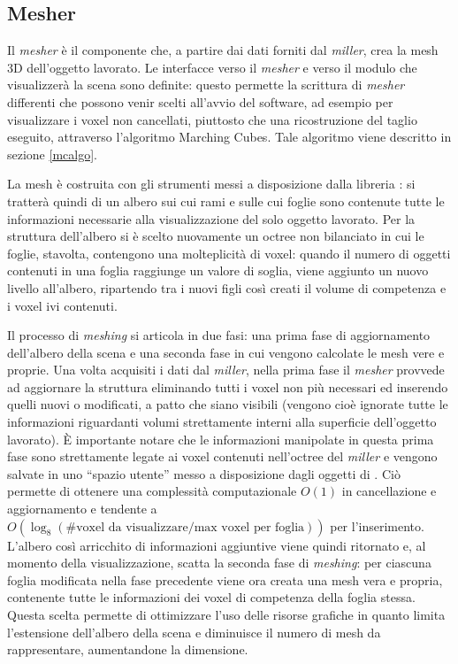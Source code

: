 \subsection{Mesher}
\label{sec:modules_mesher}
Il \emph{mesher} è il componente che, a partire dai dati forniti dal \emph{miller}, crea la mesh 3D dell'oggetto lavorato. Le interfacce verso il \emph{mesher} e verso il modulo che visualizzerà la scena sono definite: questo permette la scrittura di \emph{mesher} differenti che possono venir scelti all'avvio del software, ad esempio per visualizzare i voxel non cancellati, piuttosto che una ricostruzione del taglio eseguito, attraverso l'algoritmo Marching Cubes. Tale algoritmo viene descritto in sezione \ref{mcalgo}.

La mesh è costruita con gli strumenti messi a disposizione dalla libreria \osg: si tratterà quindi di un albero sui cui rami e sulle cui foglie sono contenute tutte le informazioni necessarie alla visualizzazione del solo oggetto lavorato. Per la struttura dell'albero si è scelto nuovamente un octree non bilanciato in cui le foglie, stavolta, contengono una molteplicità di voxel: quando il numero di oggetti contenuti in una foglia raggiunge un valore di soglia, viene aggiunto un nuovo livello all'albero, ripartendo tra i nuovi figli così creati il volume di competenza e i voxel ivi contenuti.

Il processo di \emph{meshing} si articola in due fasi: una prima fase di aggiornamento dell'albero della scena e una seconda fase in cui vengono calcolate le mesh vere e proprie. Una volta acquisiti i dati dal \emph{miller}, nella prima fase il \emph{mesher} provvede ad aggiornare la struttura eliminando tutti i voxel non più necessari ed inserendo quelli nuovi o modificati, a patto che siano visibili (vengono cioè ignorate tutte le informazioni riguardanti volumi strettamente interni alla superficie dell'oggetto lavorato). È importante notare che le informazioni manipolate in questa prima fase sono strettamente legate ai voxel contenuti nell'octree del \emph{miller} e vengono salvate in uno ``spazio utente'' messo a disposizione dagli oggetti di \osg. Ciò permette di ottenere una complessità computazionale $O(1)$ in cancellazione e aggiornamento e tendente a $O(\log_{8}(\text{\# voxel da visualizzare}/\text{max voxel per foglia}))$ per l'inserimento. L'albero così arricchito di informazioni aggiuntive viene quindi ritornato e, al momento della visualizzazione, scatta la seconda fase di \emph{meshing}: per ciascuna foglia modificata nella fase precedente viene ora creata una mesh vera e propria, contenente tutte le informazioni dei voxel di competenza della foglia stessa. Questa scelta permette di ottimizzare l'uso delle risorse grafiche in quanto limita l'estensione dell'albero della scena e diminuisce il numero di mesh da rappresentare, aumentandone la dimensione.

